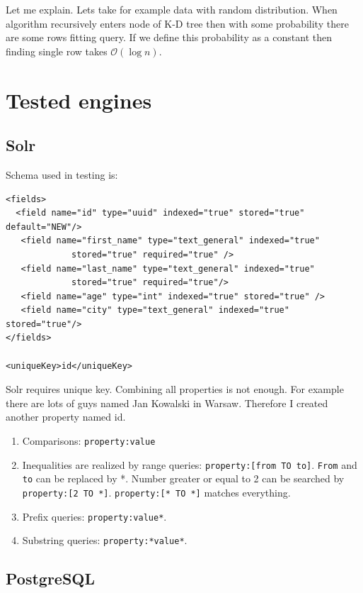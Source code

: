 \documentclass[10pt,a4paper]{article}
\newcommand{\Oh}{\mathcal{O}}
\begin{document}
Let me explain. Lets take for example data with random distribution. When algorithm recursively enters node of K-D tree then with some probability there are some rows fitting query. If we define this probability as a constant then finding single row takes $\Oh(\log n)$.

\section{Tested engines}
\subsection{Solr}

Schema used in testing is:

\begin{verbatim}
<fields>
  <field name="id" type="uuid" indexed="true" stored="true" default="NEW"/>
   <field name="first_name" type="text_general" indexed="true"
             stored="true" required="true" /> 
   <field name="last_name" type="text_general" indexed="true" 
             stored="true" required="true"/>
   <field name="age" type="int" indexed="true" stored="true" /> 
   <field name="city" type="text_general" indexed="true" stored="true"/>
</fields>

<uniqueKey>id</uniqueKey> 
\end{verbatim}

Solr requires unique key. Combining all properties is not enough. For example there are lots of guys named Jan Kowalski in Warsaw. Therefore I created another property named id.

\begin{enumerate}
\item Comparisons: \verb|property:value|
\item Inequalities are realized by range queries: \verb|property:[from TO to]|. \verb|From| and \verb|to| can be replaced by *. Number greater or equal to 2 can be searched by \verb|property:[2 TO *]|. \verb|property:[* TO *]| matches everything.
\item Prefix queries: \verb|property:value*|.
\item Substring queries: \verb|property:*value*|.
 
\end{enumerate}

\subsection{PostgreSQL}
\end{document}
